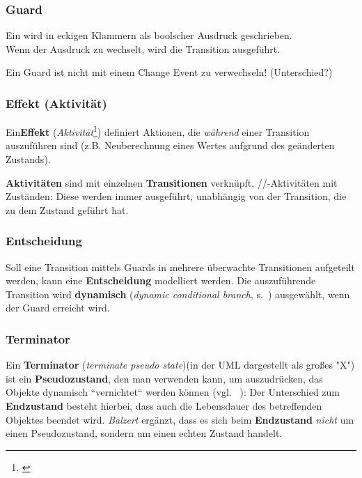 \subsubsection*{Guard}
Ein  wird in eckigen Klammern als boolscher Ausdruck geschrieben.\\
Wenn der Ausdruck zu  wechselt, wird die Transition ausgeführt.

\begin{tcolorbox}[colback=yellow!20]
    Ein Guard ist nicht mit einem Change Event zu verwechseln! (Unterschied?)
\end{tcolorbox}

\subsubsection*{Effekt (Aktivität)}
Ein\textbf{Effekt} (\textit{Aktivität}\footnote{\cite[88]{Bal05}}) definiert Aktionen, die \textit{während} einer Transition auszuführen sind (z.B. Neuberechnung eines Wertes aufgrund des geänderten Zustands).\\

\begin{tcolorbox}[colback=white]
    \textbf{Aktivitäten} sind mit einzelnen \textbf{Transitionen} verknüpft, //-Aktivitäten mit Zuständen: Diese werden immer ausgeführt, unabhängig von der Transition, die zu dem Zustand geführt hat.
\end{tcolorbox}

\subsubsection*{Entscheidung}
Soll eine Transition mittels Guards in mehrere überwachte Transitionen aufgeteilt werden, kann eine \textbf{Entscheidung} modelliert werden.
Die auszuführende Transition wird \textbf{dynamisch} (\textit{dynamic conditional branch}, s.~\cite[339 f.]{Bal05}) ausgewählt, wenn der Guard erreicht wird.

\subsubsection*{Terminator}
Ein \textbf{Terminator} (\textit{terminate pseudo state})(in der UML dargestellt als großes "X") ist ein \textbf{Pseudozustand}, den man verwenden kann, um auszudrücken, das Objekte dynamisch ``vernichtet`` werden können (vgl. ~\cite[341]{Bal05}): Der Unterschied zum \textbf{Endzustand} besteht hierbei, dass auch die Lebensdauer des betreffenden Objektes beendet wird. \textit{Balzert} ergänzt, dass es sich beim \textbf{Endzustand} \textit{nicht} um einen Pseudozustand, sondern um einen echten Zustand handelt.

